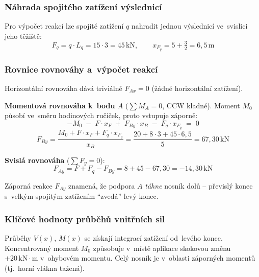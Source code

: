 \documentclass[a4paper,11pt]{article}
\newcommand{\unit}[1]{\,\mathrm{#1}}
\begin{document}
\subsubsection{Náhrada spojitého zatížení výslednicí}

Pro výpočet reakcí lze spojité zatížení $q$ nahradit jednou výslednicí ve~svislici jeho těžiště:
\begin{equation}
    F_q = q \cdot L_q = 15 \cdot 3 = 45\unit{kN}, \qquad x_{F_q} = 5 + \tfrac{3}{2} = 6{,}5\unit{m}
\end{equation}

\subsubsection{Rovnice rovnováhy a~výpočet reakcí}

Horizontální rovnováha dává triviálně $F_{Ax} = 0$ (žádné horizontální zatížení).

\medskip
\noindent\textbf{Momentová rovnováha k~bodu $A$} ($\sum M_A = 0$, CCW kladné). Moment $M_0$ působí ve~směru hodinových ručiček, proto vstupuje záporně:
\begin{equation}
    -M_0 \;-\; F \cdot x_F \;+\; F_{By} \cdot x_B \;-\; F_q \cdot x_{F_q} \;=\; 0
\end{equation}
\begin{equation}
    F_{By} = \frac{M_0 + F \cdot x_F + F_q \cdot x_{F_q}}{x_B}
           = \frac{20 + 8 \cdot 3 + 45 \cdot 6{,}5}{5}
           = \boxed{67{,}30\unit{kN}}
\end{equation}

\noindent\textbf{Svislá rovnováha} ($\sum F_y = 0$):
\begin{equation}
    F_{Ay} = F + F_q - F_{By} = 8 + 45 - 67{,}30 = \boxed{-14{,}30\unit{kN}}
\end{equation}

\noindent Záporná reakce $F_{Ay}$ znamená, že podpora $A$ \emph{táhne} nosník dolů -- převislý konec s~velkým spojitým zatížením ``zvedá'' levý konec.

\subsubsection{Klíčové hodnoty průběhů vnitřních sil}

Průběhy $V(x)$, $M(x)$ se získají integrací zatížení od~levého konce. Koncentrovaný moment $M_0$ způsobuje v~místě aplikace skokovou změnu $+20\unit{kN \cdot m}$ v~ohybovém momentu. Celý nosník je v~oblasti záporných momentů (tj.~horní vlákna tažená).
\end{document}
